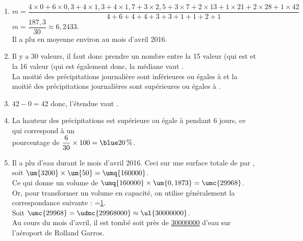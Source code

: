 \begin{corrige}
\ \\ [-5mm]
   \begin{enumerate}
      \item $m =\dfrac{4\times0+6\times0,3+4\times1,3+4\times1,7+3\times2,5+3\times7+2\times13+1\times21+2\times28+1\times42}{4+6+4+4+3+3+1+1+2+1}$ \\ [2mm]
         $m =\dfrac{187,3}{30} \approx6,2433$. \\ [2mm]
         {\blue Il a plu en moyenne environ  au mois d'avril 2016}.
      \item Il y a 30 valeurs, il faut donc prendre un nombre entre la 15 valeur (qui est  et la 16 valeur (qui est également  donc, {\blue la médiane vaut }. \\
         La moitié des précipitations journalière sont inférieures ou égales à  et la moitié des précipitations journalières sont supérieures ou égales à .
      \item $42-0 =42$ donc, {\blue l'étendue vaut }.
      \item La hauteur des précipitations est supérieure ou égale à  {\blue pendant 6 jours}, ce qui correspond à un \\ [1mm]
         pourcentage de $\dfrac{6}{30}\times100 ={\blue 20\,\%}$. \\ [1mm]
      \item Il a plu  d'eau durant le mois d'avril 2016. Ceci sur une surface totale de  par , soit $\um{3200}\times\um{50} =\umq{160000}$. \\
         Ce qui donne un volume de $\umq{160000}\times\um{0,1873} =\umc{29968}$. \\
         Or, pour transformer un volume en capacité, on utilise généralement la correspondance suivante :    =\ul{1}. \\
         Soit $\umc{29968} =\udmc{29968000} \approx \ul{30000000}$. \\
         {\blue Au cours du mois d'avril, il est tombé  soit près de \ul{30000000} d'eau sur l'aéroport de Rolland Garros}. \\ [5mm]
   \end{enumerate}
\end{corrige}

\bigskip


